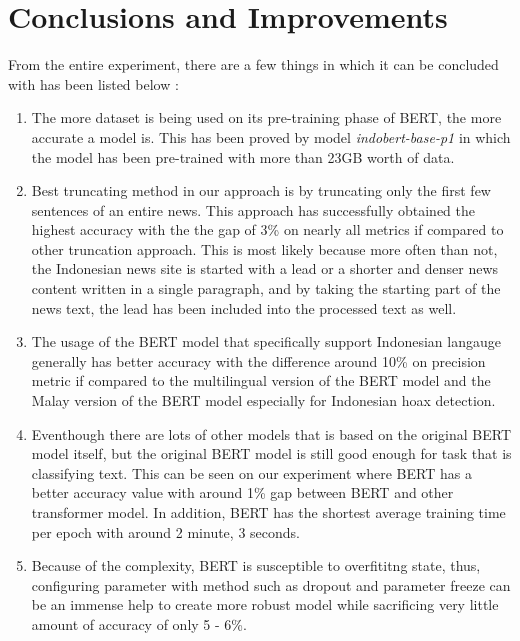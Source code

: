 \section{Conclusions and Improvements}
\label{sec:conclusionandimprovements}

From the entire experiment, there are a few things in which it can be concluded with has been listed below :

\begin{enumerate}
    \item The more dataset is being used on its pre-training phase of BERT, the more accurate a model is. This has been proved by model \textit{indobert-base-p1} in which the model has been pre-trained with more than 23GB worth of data.

    \item Best truncating method in our approach is by truncating only the first few sentences of an entire news. This approach has successfully obtained the highest accuracy with the the gap of 3\% on nearly all metrics if compared to other truncation approach. This is most likely because more often than not, the Indonesian news site is started with a lead or a shorter and denser news content written in a single paragraph, and by taking the starting part of the news text, the lead has been included into the processed text as well.

    \item The usage of the BERT model that specifically support Indonesian langauge generally has better accuracy with the difference around 10\% on precision metric if compared to the multilingual version of the BERT model and the Malay version of the BERT model especially for Indonesian hoax detection.

    \item Eventhough there are lots of other models that is based on the original BERT model itself, but the original BERT model is still good enough for task that is classifying text. This can be seen on our experiment where BERT has a better accuracy value with around 1\% gap between BERT and other transformer model. In addition, BERT has the shortest average training time per epoch with around 2 minute, 3 seconds.

    \item Because of the complexity, BERT is susceptible to overfititng state, thus, configuring parameter with method such as dropout and parameter freeze can be an immense help to create more robust model while sacrificing very little amount of accuracy of only 5 - 6\%.

\end{enumerate}

